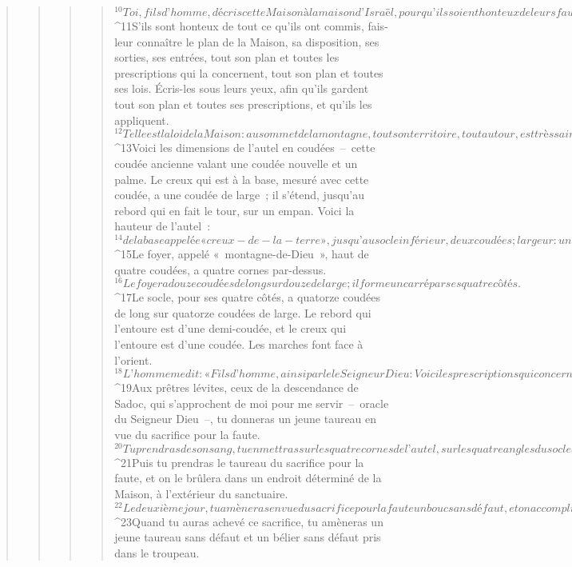 \begin{verse}
\begin{verse}
\begin{verse}
\begin{verse}
${}^{10}Toi, fils d’homme, décris cette Maison à la maison d’Israël, pour qu’ils soient honteux de leurs fautes en mesurant les dimensions de la Maison. 
${}^{11}S’ils sont honteux de tout ce qu’ils ont commis, fais-leur connaître le plan de la Maison, sa disposition, ses sorties, ses entrées, tout son plan et toutes les prescriptions qui la concernent, tout son plan et toutes ses lois. Écris-les sous leurs yeux, afin qu’ils gardent tout son plan et toutes ses prescriptions, et qu’ils les appliquent. 
${}^{12}Telle est la loi de la Maison : au sommet de la montagne, tout son territoire, tout autour, est très saint. Voilà ! Telle est la loi de la Maison. »
${}^{13}Voici les dimensions de l’autel en coudées – cette coudée ancienne valant une coudée nouvelle et un palme. Le creux qui est à la base, mesuré avec cette coudée, a une coudée de large ; il s’étend, jusqu’au rebord qui en fait le tour, sur un empan. Voici la hauteur de l’autel : 
${}^{14}de la base appelée « creux-de-la-terre », jusqu’au socle inférieur, deux coudées ; largeur : une coudée ; depuis le petit socle jusqu’au grand socle : quatre coudées ; largeur : une coudée. 
${}^{15}Le foyer, appelé « montagne-de-Dieu », haut de quatre coudées, a quatre cornes par-dessus. 
${}^{16}Le foyer a douze coudées de long sur douze de large ; il forme un carré par ses quatre côtés. 
${}^{17}Le socle, pour ses quatre côtés, a quatorze coudées de long sur quatorze coudées de large. Le rebord qui l’entoure est d’une demi-coudée, et le creux qui l’entoure est d’une coudée. Les marches font face à l’orient.
${}^{18}L’homme me dit : « Fils d’homme, ainsi parle le Seigneur Dieu : Voici les prescriptions qui concernent l’autel, pour le jour où on le bâtira, en vue d’offrir sur lui l’holocauste et d’y répandre le sang. 
${}^{19}Aux prêtres lévites, ceux de la descendance de Sadoc, qui s’approchent de moi pour me servir – oracle du Seigneur Dieu –, tu donneras un jeune taureau en vue du sacrifice pour la faute. 
${}^{20}Tu prendras de son sang, tu en mettras sur les quatre cornes de l’autel, sur les quatre angles du socle et sur le rebord qui l’entoure ; ainsi, pour l’autel, tu accompliras le sacrifice pour la faute et le rite d’expiation.
${}^{21}Puis tu prendras le taureau du sacrifice pour la faute, et on le brûlera dans un endroit déterminé de la Maison, à l’extérieur du sanctuaire. 
${}^{22}Le deuxième jour, tu amèneras en vue du sacrifice pour la faute un bouc sans défaut, et on accomplira ce sacrifice pour l’autel comme on l’a fait avec le taureau. 
${}^{23}Quand tu auras achevé ce sacrifice, tu amèneras un jeune taureau sans défaut et un bélier sans défaut pris dans le troupeau. 

\end{verse}
\end{verse}
\end{verse}
\end{verse}
